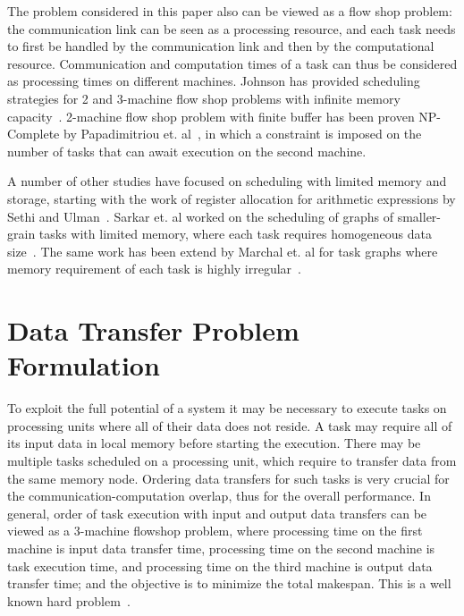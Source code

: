 \documentclass[sigconf]{acmart}
\begin{document}
	The problem considered in this paper also can be viewed as a flow shop problem: the communication link can be seen as a processing resource, and each task needs to first be handled by the communication link and then by the computational resource. Communication and computation times of a task can thus be considered as processing times on different machines. Johnson has provided scheduling strategies for 2 and 3-machine flow shop problems with infinite memory capacity~\cite{johnson}. 2-machine flow shop problem with finite buffer has been proven NP-Complete by Papadimitriou et. al~\cite{Papadimitriou:1980:FSL:322203.322213}, in which a constraint is imposed on the number of tasks that can await execution on the second machine.
	
	A number of other studies have focused on scheduling with limited memory and storage, starting with the work of register allocation for arithmetic expressions by Sethi and Ulman~\cite{Sethi:1970:GOC:321607.321620}. Sarkar et. al worked on the scheduling of graphs of smaller-grain tasks with limited memory, where each task requires homogeneous data size~\cite{vsarkar-pact}. The same work has been extend by Marchal et. al for task graphs where memory requirement of each task is highly irregular~\cite{loris-ipdps18}.
	
	
	
	\section{Data Transfer Problem Formulation}
	\label{sec:theoreticalProof}
	
	To exploit the full potential of a system it may be necessary to execute tasks on processing
	units where all of their data does not reside. A task may require all of its input data
	in local memory before starting the execution. There may be multiple tasks
	scheduled on a processing unit, which require to transfer data from the same
	memory node. Ordering data transfers for such tasks is very crucial for the
	communication-computation overlap, thus for the overall
	performance. In general, order of task execution with input
	and output data transfers can be  
	viewed as a 3-machine flowshop problem, where processing time on the first machine is 
	input data transfer time, processing time on the second machine is task execution time, 
	and processing time on the third machine is output data transfer time; and the objective is 
	to minimize the total makespan. This is a well known hard problem~\cite{NPComplete3Machine,johnson}.
	
\end{document}
